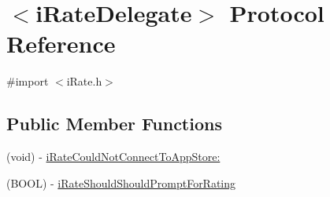 \hypertarget{protocoli_rate_delegate-p}{
\section{$<$i\-Rate\-Delegate$>$ \-Protocol \-Reference}
\label{protocoli_rate_delegate-p}
}


{\ttfamily \#import $<$i\-Rate.\-h$>$}

\subsection*{\-Public \-Member \-Functions}
\begin{DoxyCompactItemize}
\item 
(void) -\/ \hyperlink{protocoli_rate_delegate-p_aed890867dc753010b07fc2da8a43cae1}{i\-Rate\-Could\-Not\-Connect\-To\-App\-Store\-:}
\item 
(\-B\-O\-O\-L) -\/ \hyperlink{protocoli_rate_delegate-p_a9c0bf52234c57ae33a1422403ebadf43}{i\-Rate\-Should\-Should\-Prompt\-For\-Rating}
\end{DoxyCompactItemize}


